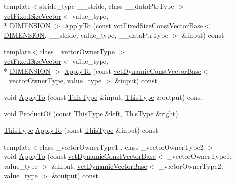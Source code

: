 \begin{DoxyCompactItemize}
\item 
{\footnotesize template$<$stride\-\_\-type \-\_\-\-\_\-stride, class \-\_\-\-\_\-data\-Ptr\-Type $>$ }\\\hyperlink{classvct_fixed_size_vector}{vct\-Fixed\-Size\-Vector}$<$ value\-\_\-type, \\*
\hyperlink{classvct_frame_base_a4284a4e875533c13df90a20c0233e043ad25b85efd5e4c2687ddf38ae18cd88f0}{D\-I\-M\-E\-N\-S\-I\-O\-N} $>$ \hyperlink{classvct_frame_base_a107a8223a3b6f746ec7c70ff5ca1c144}{Apply\-To} (const \hyperlink{classvct_fixed_size_const_vector_base}{vct\-Fixed\-Size\-Const\-Vector\-Base}$<$ \hyperlink{classvct_frame_base_a4284a4e875533c13df90a20c0233e043ad25b85efd5e4c2687ddf38ae18cd88f0}{D\-I\-M\-E\-N\-S\-I\-O\-N}, \-\_\-\-\_\-stride, value\-\_\-type, \-\_\-\-\_\-data\-Ptr\-Type $>$ \&input) const 
\item 
{\footnotesize template$<$class \-\_\-vector\-Owner\-Type $>$ }\\\hyperlink{classvct_fixed_size_vector}{vct\-Fixed\-Size\-Vector}$<$ value\-\_\-type, \\*
\hyperlink{classvct_frame_base_a4284a4e875533c13df90a20c0233e043ad25b85efd5e4c2687ddf38ae18cd88f0}{D\-I\-M\-E\-N\-S\-I\-O\-N} $>$ \hyperlink{classvct_frame_base_a0d5a9a6b0190d72b226d442f4f83e577}{Apply\-To} (const \hyperlink{classvct_dynamic_const_vector_base}{vct\-Dynamic\-Const\-Vector\-Base}$<$ \-\_\-vector\-Owner\-Type, value\-\_\-type $>$ \&input) const 
\item 
void \hyperlink{classvct_frame_base_a3159263c3424f7673426c24bdb081b9f}{Apply\-To} (const \hyperlink{classvct_frame_base_a076f1fe4fc957faa0d1ff7450d1cb768}{This\-Type} \&input, \hyperlink{classvct_frame_base_a076f1fe4fc957faa0d1ff7450d1cb768}{This\-Type} \&output) const 
\item 
void \hyperlink{classvct_frame_base_ae85dc1fd8143bc54a0e4288beacedfde}{Product\-Of} (const \hyperlink{classvct_frame_base_a076f1fe4fc957faa0d1ff7450d1cb768}{This\-Type} \&left, \hyperlink{classvct_frame_base_a076f1fe4fc957faa0d1ff7450d1cb768}{This\-Type} \&right)
\item 
\hyperlink{classvct_frame_base_a076f1fe4fc957faa0d1ff7450d1cb768}{This\-Type} \hyperlink{classvct_frame_base_abf5a72bd336913d83360b998d392c384}{Apply\-To} (const \hyperlink{classvct_frame_base_a076f1fe4fc957faa0d1ff7450d1cb768}{This\-Type} \&input) const 
\item 
{\footnotesize template$<$class \-\_\-vector\-Owner\-Type1 , class \-\_\-vector\-Owner\-Type2 $>$ }\\void \hyperlink{classvct_frame_base_ac74dec733db581ea55c2c6e7d22efab6}{Apply\-To} (const \hyperlink{classvct_dynamic_const_vector_base}{vct\-Dynamic\-Const\-Vector\-Base}$<$ \-\_\-vector\-Owner\-Type1, value\-\_\-type $>$ \&input, \hyperlink{classvct_dynamic_vector_base}{vct\-Dynamic\-Vector\-Base}$<$ \-\_\-vector\-Owner\-Type2, value\-\_\-type $>$ \&output) const 

\end{DoxyCompactItemize}
